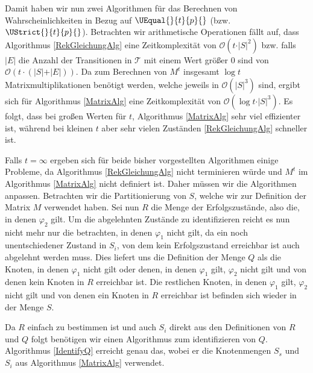 Damit haben wir nun zwei Algorithmen für das Berechnen von Wahrscheinlichkeiten in Bezug auf $\UEqual{}{t}{p}{}$ (bzw. $\UStrict{}{t}{p}{}$). 
Betrachten wir arithmetische Operationen fällt auf, dass Algorithmus \ref{RekGleichungAlg} eine Zeitkomplexität von $\mathcal{O}(t \cdot \vert S \vert^2)$ bzw. falls $\vert E \vert$ die Anzahl der Transitionen in $\mathcal{T}$ mit einem Wert größer $0$ sind von $\mathcal{O}(t\cdot (\vert S \vert + \vert E \vert))$. 
Da zum Berechnen von $M^t$ insgesamt $\log t$ Matrixmultiplikationen benötigt werden, welche jeweils in $\mathcal{O}(\vert S \vert^3)$ sind, ergibt sich für Algorithmus \ref{MatrixAlg} eine Zeitkomplexität von $\mathcal{O}(\log t \cdot \vert S \vert ^3)$. 
Es folgt, dass bei großen Werten für $t$, Algorithmus \ref{MatrixAlg} sehr viel effizienter ist, während bei kleinen $t$ aber sehr vielen Zuständen \ref{RekGleichungAlg} schneller ist. \cite{hansson1994logic}


Falls $t=\infty$ ergeben sich für beide bisher vorgestellten Algorithmen einige Probleme, da Algorithmus \ref{RekGleichungAlg} nicht terminieren würde und $M^t$ im Algorithmus \ref{MatrixAlg} nicht definiert ist.
Daher müssen wir die Algorithmen anpassen. Betrachten wir die Partitionierung von $S$, welche wir zur Definition der Matrix $M$ verwendet haben. 
Sei nun $R$ die Menge der Erfolgszustände, also die, in denen $\varphi_2$ gilt. 
Um die abgelehnten Zustände zu identifizieren reicht es nun nicht mehr nur die betrachten, in denen $\varphi_1$ nicht gilt, da ein noch unentschiedener Zustand in $S_i$, von dem kein Erfolgszustand erreichbar ist auch abgelehnt werden muss.
Dies liefert uns die Definition der Menge $Q$ als die Knoten, in denen $\varphi_1$ nicht gilt oder denen, in denen $\varphi_1$ gilt, $\varphi_2$ nicht gilt und von denen kein Knoten in $R$ erreichbar ist.
Die restlichen Knoten, in denen $\varphi_1$ gilt, $\varphi_2$ nicht gilt und von denen ein Knoten in $R$ erreichbar ist befinden sich wieder in der Menge $S$. \cite{hansson1994logic}

Da $R$ einfach zu bestimmen ist und auch $S_i$ direkt aus den Definitionen von $R$ und $Q$ folgt benötigen wir einen Algorithmus zum identifizieren von $Q$. Algorithmus \ref{IdentifyQ} erreicht genau das, wobei er die Knotenmengen $S_s$ und $S_i$ aus Algorithmus \ref{MatrixAlg} verwendet.

